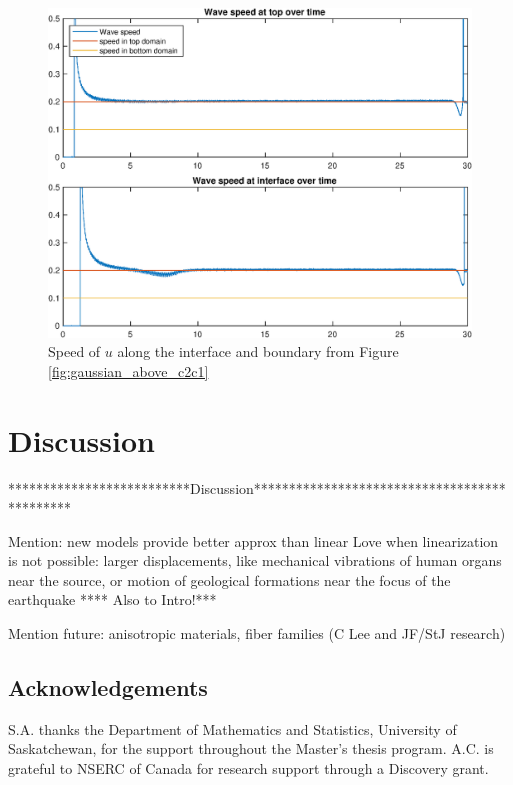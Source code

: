 \documentclass[11pt,letter,subeqn,fleqn]{article}
\numberwithin{equation}{section}
\numberwithin{table}{section}
\numberwithin{figure}{section}
\begin{document}
\begin{figure}[htbp]
	\caption{Speed of $u$ along the interface and boundary from Figure \ref{fig:gaussian_above_c2c1}}
	\label{fig:gaussian_above_c2c1_speed}
	\includegraphics[width=\linewidth]{figures/gaussian_above_c2c1/wavespeeds}
\footnotesize
\centering

\end{figure}



\section{Discussion}\label{sec:Discussion}

**************************Discussion*********************************************

Mention: new models provide better approx than linear Love when linearization is not possible: larger displacements, like mechanical vibrations of human organs near the source, or motion of geological formations near the focus of the earthquake **** Also to Intro!***


Mention future: anisotropic materials, fiber families (C Lee and JF/StJ research)


\subsection*{Acknowledgements}

S.A. thanks the Department of Mathematics and Statistics, University of Saskatchewan, for the support throughout the Master's thesis program. A.C. is grateful to NSERC of Canada for research support through a Discovery grant.

{\footnotesize
%


}
\end{document}
